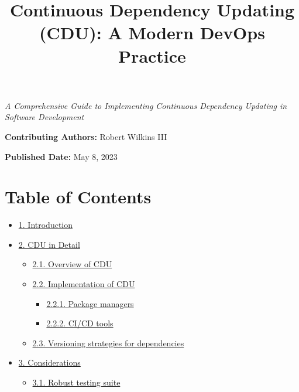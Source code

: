 \documentclass[10pt]{article}
\title{Continuous Dependency Updating (CDU): A Modern DevOps Practice}
\author{}
\date{}
\begin{document}
\maketitle

\textit{A Comprehensive Guide to Implementing Continuous Dependency Updating in Software Development}

\textbf{Contributing Authors:} Robert Wilkins III

\textbf{Published Date:} May 8, 2023

\section*{Table of Contents}

\begin{itemize}

  \item \href{#introduction}{1. Introduction}

  \item \href{#cdu-in-detail}{2. CDU in Detail}

  \begin{itemize}

    \item \href{#21-overview-of-cdu}{2.1. Overview of CDU}

    \item \href{#22-implementation-of-cdu}{2.2. Implementation of CDU}

    \begin{itemize}

      \item \href{#221-package-managers}{2.2.1. Package managers}

      \item \href{#222-cicd-tools}{2.2.2. CI/CD tools}

    \end{itemize}

    \item \href{#23-versioning-strategies-for-dependencies}{2.3. Versioning strategies for dependencies}

  \end{itemize}

  \item \href{#considerations}{3. Considerations}

  \begin{itemize}

    \item \href{#31-robust-testing-suite}{3.1. Robust testing suite}


\end{itemize}
\end{itemize}
\end{document}
